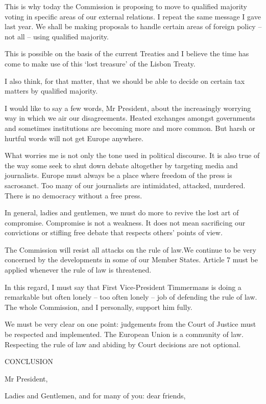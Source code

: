 \documentclass[a4paper,11pt]{article}
\begin{document}
This is why today the Commission is proposing to move to qualified majority voting in specific areas of our external relations. I repeat the same message I gave last year. We shall be making proposals to handle certain areas of foreign policy – not all – using qualified majority.

This is possible on the basis of the current Treaties and I believe the time has come to make use of this ‘lost treasure' of the Lisbon Treaty.

I also think, for that matter, that we should be able to decide on certain tax matters by qualified majority.

I would like to say a few words, Mr President, about the increasingly worrying way in which we air our disagreements. Heated exchanges amongst governments and sometimes institutions are becoming more and more common. But harsh or hurtful words will not get Europe anywhere.

What worries me is not only the tone used in political discourse. It is also true of the way some seek to shut down debate altogether by targeting media and journalists. Europe must always be a place where freedom of the press is sacrosanct. Too many of our journalists are intimidated, attacked, murdered. There is no democracy without a free press.

In general, ladies and gentlemen, we must do more to revive the lost art of compromise. Compromise is not a weakness. It does not mean sacrificing our convictions or stifling free debate that respects others' points of view.

The Commission will resist all attacks on the rule of law.We continue to be very concerned by the developments in some of our Member States. Article 7 must be applied whenever the rule of law is threatened.

In this regard, I must say that First Vice-President Timmermans is doing a remarkable but often lonely – too often lonely – job of defending the rule of law. The whole Commission, and I personally, support him fully.

We must be very clear on one point: judgements from the Court of Justice must be respected and implemented. The European Union is a community of law. Respecting the rule of law and abiding by Court decisions are not optional.

 

CONCLUSION

Mr President,

Ladies and Gentlemen, and for many of you: dear friends,
\end{document}
